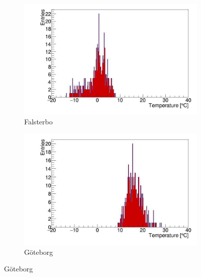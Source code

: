 \begin{figure}[h]
    \centering
    \begin{subfigure}[b]{0.49\textwidth}
    \centering
    \includegraphics[width=\textwidth]{LU_1_P.jpg}
        \caption{Falsterbo}
    \end{subfigure}
    \hfill
    \begin{subfigure}[b]{0.49\textwidth}
    \centering
    \includegraphics[width=\textwidth]{LU_8_23_P.jpg}
        \caption{Göteborg}
    \end{subfigure}
    
\end{figure}





